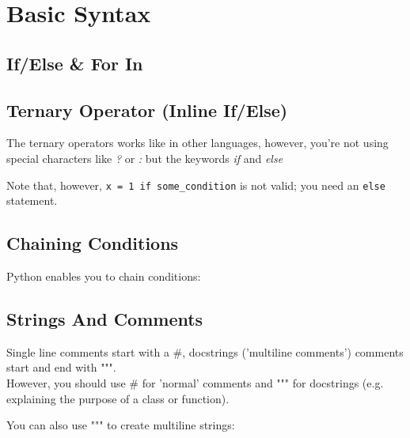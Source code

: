 \section{Basic Syntax}

    \subsection{If/Else \& For In}

    \subsection{Ternary Operator (Inline If/Else)}
        The ternary operators works like in other languages, however, you're not using special
        characters like \textit{?} or \textit{:} but the keywords \textit{if} and \textit{else}

        Note that, however, \texttt{x = 1 if some_condition} is not valid; you need an
        \texttt{else} statement.

    \subsection{Chaining Conditions}
        Python enables you to chain conditions:


    \subsection{Strings And Comments}
        Single line comments start with a \#, docstrings ('multiline comments') comments start and
        end with """. \\
        However, you should use \# for 'normal' comments and """ for docstrings (e.g. explaining the
        purpose of a class or function).

        You can also use """ to create multiline strings:


